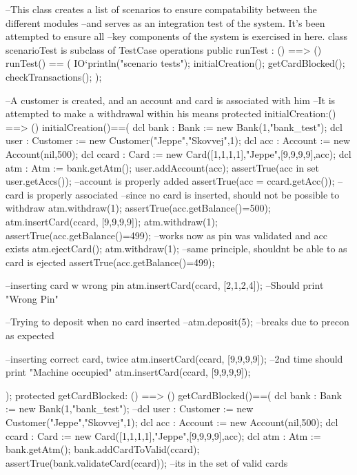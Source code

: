 \documentclass[a4paper]{article}
\begin{document}
\title{}
\author{}
\begin{vdm_al}
--This class creates a list of scenarios to ensure compatability between the different modules
--and serves as an integration test of the system. It's been attempted to ensure all
--key components of the system is exercised in here. 
class scenarioTest is subclass of TestCase 
operations
    public runTest : () ==> ()
    runTest() == (
        IO`println("scenario tests");
        initialCreation();
        getCardBlocked();
        checkTransactions();
    );

    --A customer is created, and an account and card is associated with him
    --It is attempted to make a withdrawal within his means
    protected initialCreation:() ==> ()
    initialCreation()==(
        dcl bank : Bank := new Bank(1,"bank_test");
        dcl user : Customer := new Customer("Jeppe","Skovvej",1);
        dcl acc : Account := new Account(nil,500);
        dcl ccard : Card := new Card([1,1,1,1],"Jeppe",[9,9,9,9],acc);
        dcl atm : Atm := bank.getAtm();
        user.addAccount(acc);
        assertTrue(acc in set user.getAccs()); --account is properly added
        assertTrue(acc = ccard.getAcc()); --card is properly associated
        --since no card is inserted, should not be possible to withdraw
        atm.withdraw(1);
        assertTrue(acc.getBalance()=500);
        atm.insertCard(ccard, [9,9,9,9]);
        atm.withdraw(1);
        assertTrue(acc.getBalance()=499); --works now as pin was validated and acc exists
        atm.ejectCard();
        atm.withdraw(1); --same principle, shouldnt be able to as card is ejected
        assertTrue(acc.getBalance()=499);

        --inserting card w wrong pin
        atm.insertCard(ccard, [2,1,2,4]); --Should print "Wrong Pin"

        --Trying to deposit when no card inserted
        --atm.deposit(5); --breaks due to precon as expected
        
        --inserting correct card, twice
        atm.insertCard(ccard, [9,9,9,9]);
        --2nd time should print "Machine occupied"
        atm.insertCard(ccard, [9,9,9,9]);

    );
    protected getCardBlocked: () ==> ()
    getCardBlocked()==(
        dcl bank : Bank := new Bank(1,"bank_test");
        --dcl user : Customer := new Customer("Jeppe","Skovvej",1);
        dcl acc : Account := new Account(nil,500);
        dcl ccard : Card := new Card([1,1,1,1],"Jeppe",[9,9,9,9],acc);
        dcl atm : Atm := bank.getAtm();
        bank.addCardToValid(ccard);
        assertTrue(bank.validateCard(ccard)); --its in the set of valid cards
        

\end{vdm_al}
\end{document}

